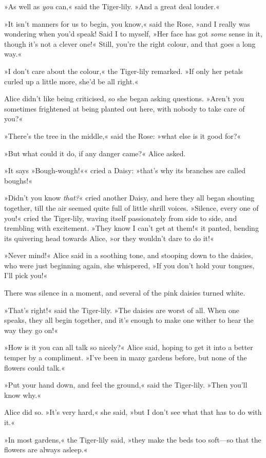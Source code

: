»As well as \textit{you} can,« said the Tiger-lily. »And a great deal louder.«

»It isn't manners for us to begin, you know,« said the Rose, »and I really was wondering when you'd speak! Said I to myself, »Her face has got \textit{some} sense in it, though it's not a clever one!« Still, you're the right colour, and that goes a long way.«

»I don't care about the colour,« the Tiger-lily remarked. »If only her petals curled up a little more, she'd be all right.«

Alice didn't like being criticised, so she began asking questions. »Aren't you sometimes frightened at being planted out here, with nobody to take care of you?«

»There's the tree in the middle,« said the Rose: »what else is it good for?«

»But what could it do, if any danger came?« Alice asked.

»It says »Bough-wough!«« cried a Daisy: »that's why its branches are called boughs!«

»Didn't you know \textit{that?}« cried another Daisy, and here they all began shouting together, till the air seemed quite full of little shrill voices. »Silence, every one of you!« cried the Tiger-lily, waving itself passionately from side to side, and trembling with excitement. »They know I can't get at them!« it panted, bending its quivering head towards Alice, »or they wouldn't dare to do it!«

»Never mind!« Alice said in a soothing tone, and stooping down to the daisies, who were just beginning again, she whispered, »If you don't hold your tongues, I'll pick you!«

There was silence in a moment, and several of the pink daisies turned white.

»That's right!« said the Tiger-lily. »The daisies are worst of all. When one speaks, they all begin together, and it's enough to make one wither to hear the way they go on!«

»How is it you can all talk so nicely?« Alice said, hoping to get it into a better temper by a compliment. »I've been in many gardens before, but none of the flowers could talk.«

»Put your hand down, and feel the ground,« said the Tiger-lily. »Then you'll know why.«

Alice did so. »It's very hard,« she said, »but I don't see what that has to do with it.«

»In most gardens,« the Tiger-lily said, »they make the beds too soft—so that the flowers are always asleep.«

